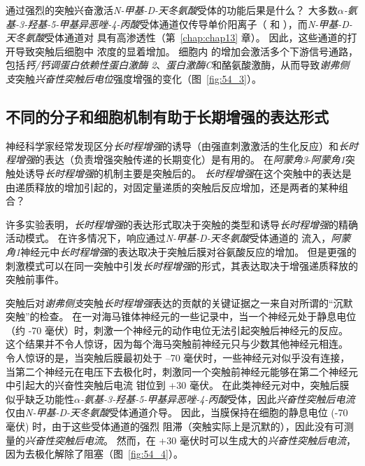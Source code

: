 通过强烈的突触兴奋激活\textit{N-甲基-D-天冬氨酸}受体的功能后果是什么？
大多数\textit{$\alpha$-氨基-3-羟基-5-甲基异恶唑-4-丙酸}受体通道仅传导单价阳离子（ 和 ），而\textit{N-甲基-D-天冬氨酸}受体通道对  具有高渗透性（第~\ref{chap:chap13} 章）。
因此，这些通道的打开导致突触后细胞中  浓度的显着增加。
细胞内  的增加会激活多个下游信号通路，包括\textit{钙/钙调蛋白依赖性蛋白激酶 2}、\textit{蛋白激酶C}和酪氨酸激酶，从而导致\textit{谢弗侧支}突触\textit{兴奋性突触后电位}强度增强的变化（图~\ref{fig:54_3}）。



\subsection{不同的分子和细胞机制有助于长期增强的表达形式}

神经科学家经常发现区分\textit{长时程增强}的诱导（由强直刺激激活的生化反应）和\textit{长时程增强}的表达（负责增强突触传递的长期变化）是有用的。
在\textit{阿蒙角3}-\textit{阿蒙角1}突触处诱导\textit{长时程增强}的机制主要是突触后的。
\textit{长时程增强}在这个突触中的表达是由递质释放的增加引起的，对固定量递质的突触后反应增加，还是两者的某种组合？


许多实验表明，\textit{长时程增强}的表达形式取决于突触的类型和诱导\textit{长时程增强}的精确活动模式。
在许多情况下，响应通过\textit{N-甲基-D-天冬氨酸}受体通道的  流入，\textit{阿蒙角1}神经元中\textit{长时程增强}的表达取决于突触后膜对谷氨酸反应的增加。
但是更强的刺激模式可以在同一突触中引发\textit{长时程增强}的形式，其表达取决于增强递质释放的突触前事件。


突触后对\textit{谢弗侧支}突触\textit{长时程增强}表达的贡献的关键证据之一来自对所谓的“沉默突触”的检查。
在一对海马锥体神经元的一些记录中，当一个神经元处于静息电位（约 -70 毫伏）时，刺激一个神经元的动作电位无法引起突触后神经元的反应。
这个结果并不令人惊讶，因为每个海马突触前神经元只与少数其他神经元相连。
令人惊讶的是，当突触后膜最初处于 –70 毫伏时，一些神经元对似乎没有连接，当第二个神经元在电压下去极化时，刺激同一个突触前神经元能够在第二个神经元中引起大的兴奋性突触后电流 钳位到 +30 毫伏。
在此类神经元对中，突触后膜似乎缺乏功能性\textit{$\alpha$-氨基-3-羟基-5-甲基异恶唑-4-丙酸}受体，因此\textit{兴奋性突触后电流}仅由\textit{N-甲基-D-天冬氨酸}受体通道介导。
因此，当膜保持在细胞的静息电位 (-70 毫伏) 时，由于这些受体通道的强烈  阻滞（突触实际上是沉默的），因此没有可测量的\textit{兴奋性突触后电流}。
然而，在 +30 毫伏时可以生成大的\textit{兴奋性突触后电流}，因为去极化解除了阻塞（图~\ref{fig:54_4}）。



